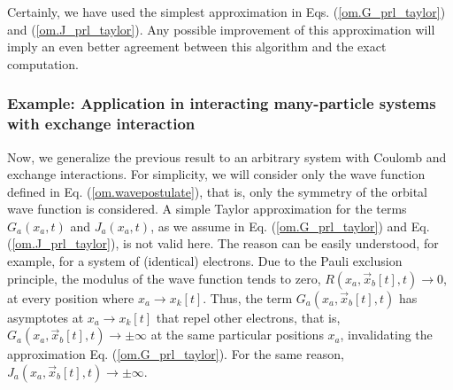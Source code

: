 \documentclass[nofootinbib, secnumarabic, amsmath, nobibnotes,10pt,aps,pra]{revtex4-1}
\newcommand{\eref}[1]{Eq. (\ref{#1})}
\begin{document}
Certainly, we have used the simplest approximation in Eqs. (\ref{om.G_prl_taylor}) and (\ref{om.J_prl_taylor}). Any possible improvement of this approximation will imply an even better agreement between this algorithm and the exact computation.

\subsubsection{Example: Application in interacting many-particle systems with exchange interaction}

Now, we generalize the previous result to an arbitrary system with
Coulomb and exchange interactions. For simplicity, we will consider
only the wave function defined in \eref{om.wavepostulate}, that is,
only the symmetry of the orbital wave function is considered. A
simple Taylor approximation for the terms \textit{$G_{a}(x_a,t)$}
and \textit{$J_{a}(x_a,t)$}, as we assume in \eref{om.G_prl_taylor}
and \eref{om.J_prl_taylor}, is not valid here. The reason can be
easily understood, for example, for a system of (identical)
electrons. Due to the Pauli exclusion principle, the modulus of the
wave function tends to zero, $R({{x}_{a}},{{\vec{x}}_{b}}[t],t)\to
0$, at every position where ${{x}_{a}}\to {{x}_{k}}[t]$. Thus, the term
\textit{${{G}_{a}}({{x}_{a}},{{\vec{x}}_{b}}[t],t)$} has asymptotes
at ${{x}_{a}}\to {{x}_{k}}[t]$ that repel other electrons, that is,
${G}_{a}({{x}_{a}},{{\vec{x}}_{b}}[t],t) \to \pm \infty $ at the
same particular positions $x_a$, invalidating the approximation
\eref{om.G_prl_taylor}. For the same reason,
${J}_{a}({{x}_{a}},{{\vec{x}}_{b}}[t],t) \to \pm \infty $.
\end{document}
